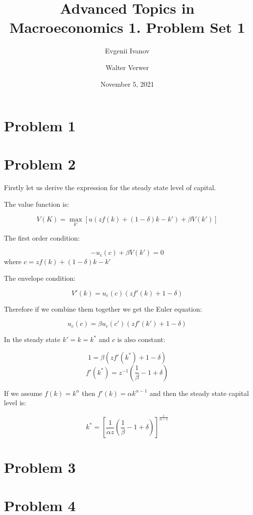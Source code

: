 \documentclass[12pt]{article}
\newcommand{\?}{\stackrel{?}{=}}
\begin{document}
\title{\vspace{-1.5cm} Advanced Topics in Macroeconomics 1. Problem Set 1}
\author{Evgenii Ivanov \and Walter Verwer}
\date{November 5, 2021}
 
\maketitle

\section*{Problem 1}

\section*{Problem 2}

Firstly let us derive the expression for the steady state level of capital.

The value function is:

\[
V(K) = \max_{k'} [ u(zf(k) + (1-\delta)k - k') + \beta V(k')]
\]

The first order condition:

\[
-u_c (c) + \beta V(k') = 0
\]
where $c = zf(k) + (1-\delta)k - k'$

The envelope condition:

\[
V'(k) = u_c (c) (zf'(k) + 1-\delta)
\]

Therefore if we combine them together we get the Euler equation:

\[
u_c (c) = \beta u_c (c') (zf'(k') + 1-\delta) 
\]

In the steady state $k'=k=k^*$ and $c$ is also constant:

\[
1 = \beta (zf'(k^*) + 1 - \delta)
\]
\[
f'(k^*) = z^{-1} \left( \frac{1}{\beta} - 1 + \delta \right)
\]

If we assume $f(k) = k^\alpha$ then $f'(k) = \alpha k^{\alpha-1}$ and then the steady state capital level is:

\[
k^* = \left[ \frac{1}{\alpha z} \left( \frac{1}{\beta} - 1 + \delta \right) \right]^{\frac{1}{\alpha-1}}
\]

\section*{Problem 3}

\section*{Problem 4}
\end{document}
